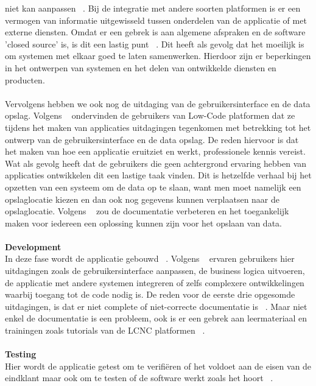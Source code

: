 niet kan aanpassen ~\autocite{Rokis_2022}. Bij de integratie met andere soorten platformen is er een vermogen van informatie uitgewisseld tussen onderdelen van de applicatie 
of met externe diensten. Omdat er een gebrek is aan algemene afspraken en de software 'closed source' is, is dit een lastig punt ~\autocite{Rokis_2022}.
 Dit heeft als gevolg dat het moeilijk is om systemen met elkaar goed te laten samenwerken. 
 Hierdoor zijn er beperkingen in het ontwerpen van systemen en het delen van ontwikkelde diensten en producten.\\\\ 
 Vervolgens hebben we ook nog de uitdaging van de gebruikersinterface en de data opslag. Volgens ~\textcite{Rokis_2022} 
 ondervinden de gebruikers van Low-Code platformen dat ze tijdens het maken van applicaties uitdagingen tegenkomen met betrekking tot het ontwerp 
 van de gebruikersinterface en de data opslag. De reden hiervoor is dat het maken van hoe een applicatie eruitziet en werkt, professionele kennis vereist. 
 Wat als gevolg heeft dat de gebruikers die geen achtergrond ervaring hebben van applicaties ontwikkelen dit een lastige taak vinden. 
 Dit is hetzelfde verhaal bij het opzetten van een systeem om de data op te slaan, want men moet namelijk een opslaglocatie kiezen en dan ook nog gegevens 
 kunnen verplaatsen naar de opslaglocatie. Volgens ~\textcite{Rokis_2022} zou de documentatie verbeteren en het toegankelijk maken voor iedereen 
 een oplossing kunnen zijn voor het opslaan van data.
\\
\\
\textbf{Development}
\\
In deze fase wordt de applicatie gebouwd ~\autocite{Ghumatkar_2023}. 
Volgens ~\textcite{Rokis_2022} ervaren gebruikers hier uitdagingen zoals de gebruikersinterface aanpassen, de business logica uitvoeren, de applicatie met andere systemen integreren of zelfs complexere ontwikkelingen waarbij toegang tot de code nodig is. 
De reden voor de eerste drie opgesomde uitdagingen, is dat er niet complete of niet-correcte documentatie is ~\autocite{Rokis_2022}. 
Maar niet enkel de documentatie is een probleem, ook is er een gebrek aan leermateriaal en trainingen zoals tutorials van de LCNC platformen ~\autocite{Rokis_2022}.
\\
\\
\textbf{Testing}
\\
Hier wordt de applicatie getest om te verifiëren of het voldoet aan de eisen van de eindklant maar ook om te testen of de software werkt zoals het hoort ~\autocite{Ghumatkar_2023}. 
